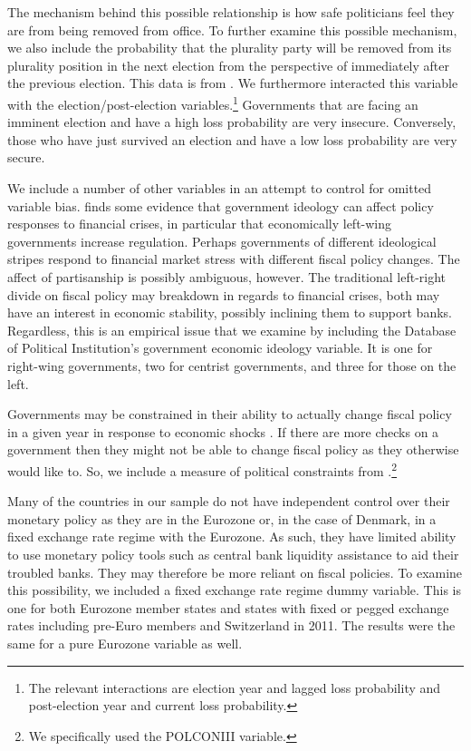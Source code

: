 \documentclass[]{article}
\begin{document}
The mechanism behind this possible relationship is how safe politicians feel they are from being removed from office. To further examine this possible mechanism, we also include the probability that the plurality party will be removed from its plurality position in the next election from the perspective of immediately after the previous election. This data is from \cite{Kayser2015comp}. We furthermore interacted this variable with the election/post-election variables.\footnote{The relevant interactions are election year and lagged loss probability and post-election year and current loss probability.} Governments that are facing an imminent election and have a high loss probability are very insecure. Conversely, those who have just survived an election and have a low loss probability are very secure.

We include a number of other variables in an attempt to control for omitted variable bias. \cite{broz2013} finds some evidence that government ideology can affect policy responses to financial crises, in particular that economically left-wing governments increase regulation. Perhaps governments of different ideological stripes respond to financial market stress with different fiscal policy changes. The affect of partisanship is possibly ambiguous, however. The traditional left-right divide on fiscal policy may breakdown in regards to financial crises, both may have an interest in economic stability, possibly inclining them to support banks. Regardless, this is an empirical issue that we examine by including the Database of Political Institution's \citep[][updated through 2012]{DPI2001} government economic ideology variable. It is one for right-wing governments, two for centrist governments, and three for those on the left.

Governments may be constrained in their ability to actually change fiscal policy in a given year in response to economic shocks \cite[e.g.][]{MacIntyre2001}. If there are more checks on a government then they might not be able to change fiscal policy as they otherwise would like to. So, we include a measure of political constraints from \cite[][updated through 2011]{Henisz2004}.\footnote{We specifically used the POLCONIII variable.}

Many of the countries in our sample do not have independent control over their monetary policy as they are in the Eurozone or, in the case of Denmark, in a fixed exchange rate regime with the Eurozone. As such, they have limited ability to use monetary policy tools such as central bank liquidity assistance to aid their troubled banks. They may therefore be more reliant on fiscal policies. To examine this possibility, we included a fixed exchange rate regime dummy variable. This is one for both Eurozone member states and states with fixed or pegged exchange rates including pre-Euro members and Switzerland in 2011. The results were the same for a pure Eurozone variable as well.
\end{document}
